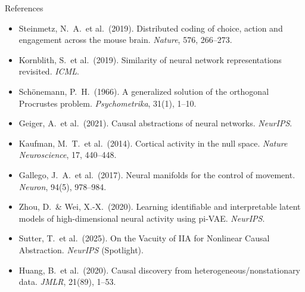 \documentclass[aspectratio=169,11pt]{beamer}
\begin{document}
\begin{frame}{References}
{\scriptsize
\begin{itemize}\setlength\itemsep{2pt}
  \item Steinmetz, N.\ A.\ et al.\ (2019). Distributed coding of choice, action and engagement across the mouse brain. \emph{Nature}, 576, 266--273.
  \item Kornblith, S.\ et al.\ (2019). Similarity of neural network representations revisited. \emph{ICML}.
  \item Sch\"onemann, P.\ H.\ (1966). A generalized solution of the orthogonal Procrustes problem. \emph{Psychometrika}, 31(1), 1--10.
  \item Geiger, A.\ et al.\ (2021). Causal abstractions of neural networks. \emph{NeurIPS}.
  \item Kaufman, M.\ T.\ et al.\ (2014). Cortical activity in the null space. \emph{Nature Neuroscience}, 17, 440--448.
  \item Gallego, J.\ A.\ et al.\ (2017). Neural manifolds for the control of movement. \emph{Neuron}, 94(5), 978--984.
  \item Zhou, D.\ \& Wei, X.-X.\ (2020). Learning identifiable and interpretable latent models of high-dimensional neural activity using pi-VAE. \emph{NeurIPS}.
  \item Sutter, T.\ et al.\ (2025). On the Vacuity of IIA for Nonlinear Causal Abstraction. \emph{NeurIPS} (Spotlight).
  \item Huang, B.\ et al.\ (2020). Causal discovery from heterogeneous/nonstationary data. \emph{JMLR}, 21(89), 1--53.
\end{itemize}
}
\end{frame}
\end{document}
